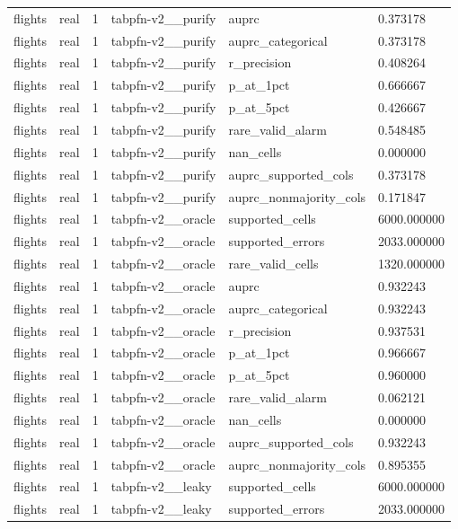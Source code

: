 \begin{tabular}{llllll}
flights & real & 1 & tabpfn-v2\_\_purify & auprc & 0.373178 \\
flights & real & 1 & tabpfn-v2\_\_purify & auprc\_categorical & 0.373178 \\
flights & real & 1 & tabpfn-v2\_\_purify & r\_precision & 0.408264 \\
flights & real & 1 & tabpfn-v2\_\_purify & p\_at\_1pct & 0.666667 \\
flights & real & 1 & tabpfn-v2\_\_purify & p\_at\_5pct & 0.426667 \\
flights & real & 1 & tabpfn-v2\_\_purify & rare\_valid\_alarm & 0.548485 \\
flights & real & 1 & tabpfn-v2\_\_purify & nan\_cells & 0.000000 \\
flights & real & 1 & tabpfn-v2\_\_purify & auprc\_supported\_cols & 0.373178 \\
flights & real & 1 & tabpfn-v2\_\_purify & auprc\_nonmajority\_cols & 0.171847 \\
flights & real & 1 & tabpfn-v2\_\_oracle & supported\_cells & 6000.000000 \\
flights & real & 1 & tabpfn-v2\_\_oracle & supported\_errors & 2033.000000 \\
flights & real & 1 & tabpfn-v2\_\_oracle & rare\_valid\_cells & 1320.000000 \\
flights & real & 1 & tabpfn-v2\_\_oracle & auprc & 0.932243 \\
flights & real & 1 & tabpfn-v2\_\_oracle & auprc\_categorical & 0.932243 \\
flights & real & 1 & tabpfn-v2\_\_oracle & r\_precision & 0.937531 \\
flights & real & 1 & tabpfn-v2\_\_oracle & p\_at\_1pct & 0.966667 \\
flights & real & 1 & tabpfn-v2\_\_oracle & p\_at\_5pct & 0.960000 \\
flights & real & 1 & tabpfn-v2\_\_oracle & rare\_valid\_alarm & 0.062121 \\
flights & real & 1 & tabpfn-v2\_\_oracle & nan\_cells & 0.000000 \\
flights & real & 1 & tabpfn-v2\_\_oracle & auprc\_supported\_cols & 0.932243 \\
flights & real & 1 & tabpfn-v2\_\_oracle & auprc\_nonmajority\_cols & 0.895355 \\
flights & real & 1 & tabpfn-v2\_\_leaky & supported\_cells & 6000.000000 \\
flights & real & 1 & tabpfn-v2\_\_leaky & supported\_errors & 2033.000000 \\

\end{tabular}

